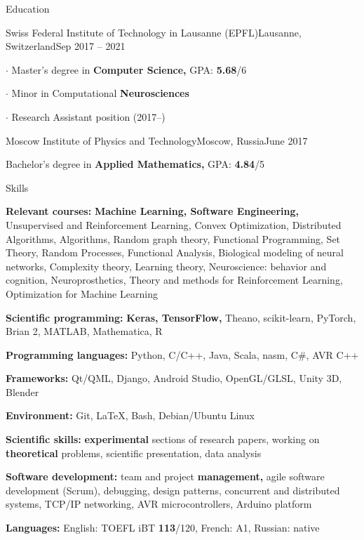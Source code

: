 \documentclass{resume} %
\begin{document}
\newcommand{\myitem}{\item[\textcolor{grayitem}{$\cdot$}]}
\begin{rSection}{Education}
\hspace{-1em}
\begin{rSubsection}{Swiss Federal Institute of Technology in Lausanne (EPFL)}{}{Lausanne, Switzerland}{Sep 2017 -- 2021}
\myitem Master's degree in {\bf Computer Science,} GPA: {\bf 5.68}/6
\myitem Minor in Computational {\bf Neurosciences}
\myitem Research Assistant position (2017--)
\end{rSubsection}
\begin{rSubsection}{Moscow Institute of Physics and Technology}{}{Moscow, Russia}{June 2017}
\item[] Bachelor's degree in {\bf Applied Mathematics,} GPA: {\bf 4.84}/5
\end{rSubsection}
\end{rSection}

\begin{rSection}{Skills}
	\vspace{-1em}
	\item {\color{grayheading}\bf Relevant courses:} {\bf Machine Learning, Software Engineering,} {\small Unsupervised and Reinforcement Learning, Convex Optimization, Distributed Algorithms, Algorithms, Random graph theory, Functional Programming, Set Theory, Random Processes, Functional Analysis, Biological modeling of neural networks, Complexity theory, Learning theory, Neuroscience: behavior and cognition, Neuroprosthetics, Theory and methods for Reinforcement Learning, Optimization for Machine Learning}
	\item {\color{grayheading}\bf Scientific programming:} {\bf Keras, TensorFlow,} Theano, scikit-learn, PyTorch, Brian 2, MATLAB, Mathematica, R
	\item {\color{grayheading}\bf Programming languages:} Python, C/C++, Java, {\small Scala, nasm, C\#, AVR C++}
	\item {\color{grayheading}\bf Frameworks:} Qt/QML, Django, {\small Android Studio, OpenGL/GLSL, Unity 3D, Blender}
	\item {\color{grayheading}\bf Environment:} Git, \LaTeX, Bash, Debian/Ubuntu Linux
	\item {\color{grayheading}\bf Scientific skills:} {\bf experimental} sections of research papers, working on {\bf theoretical} problems, scientific presentation, data analysis
	\item {\color{grayheading}\bf Software development:} team and project {\bf management,} agile software development (Scrum), debugging, design patterns, concurrent and distributed systems, {\small TCP/IP networking, AVR microcontrollers, Arduino platform}
	\item {\color{grayheading}\bf Languages:} English: TOEFL iBT {\bf 113}/120, {\small French: A1, Russian: native}
\end{rSection}
\end{document}
